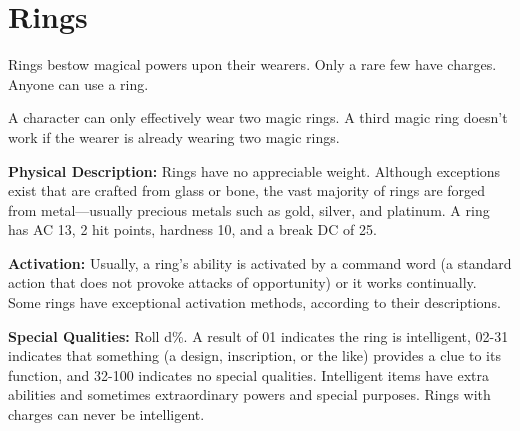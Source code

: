 
\section{Rings}

Rings bestow magical powers upon their wearers. Only a rare few have charges. Anyone 
can use a ring.

A character can only effectively wear two magic rings. A third magic ring doesn't 
work if the wearer is already wearing two magic rings.

\textbf{Physical Description:} Rings have no appreciable weight. Although exceptions 
exist that are crafted from glass or bone, the vast majority of rings are forged 
from metal---usually precious metals such as gold, silver, and platinum. A ring 
has AC 13, 2 hit points, hardness 10, and a break DC of 25.

\textbf{Activation:} Usually, a ring's ability is activated by a command word (a 
standard action that does not provoke attacks of opportunity) or it works continually. 
Some rings have exceptional activation methods, according to their descriptions.

\textbf{Special Qualities:} Roll d\%. A result of 01 indicates the ring is intelligent, 
02-31 indicates that something (a design, inscription, or the like) provides a 
clue to its function, and 32-100 indicates no special qualities. Intelligent items 
have extra abilities and sometimes extraordinary powers and special purposes. Rings 
with charges can never be intelligent.

